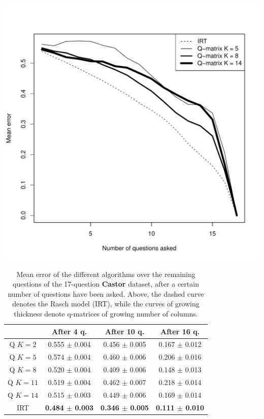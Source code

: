 \documentclass{edm_template}
\begin{document}
\begin{table}[h]
\includegraphics[width=\linewidth]{castor.pdf}
\small\centering\begin{tabular}{@{}c|ccc@{}}
& After 4 q. & After 10 q. & After 16 q.\\
\hline
Q $K = 2$ & 0.555 $\pm$ 0.004 & 0.456 $\pm$ 0.005 & 0.167 $\pm$ 0.012 \\
Q $K = 5$ & 0.574 $\pm$ 0.004 & 0.460 $\pm$ 0.006 & 0.206 $\pm$ 0.016 \\
Q $K = 8$ & 0.520 $\pm$ 0.004 & 0.409 $\pm$ 0.006 & 0.148 $\pm$ 0.013 \\
Q $K = 11$ & 0.519 $\pm$ 0.004 & 0.462 $\pm$ 0.007 & 0.218 $\pm$ 0.014 \\
Q $K = 14$ & 0.515 $\pm$ 0.003 & 0.449 $\pm$ 0.006 & 0.169 $\pm$ 0.014 \\
IRT & \textbf{0.484 $\pm$ \textbf0.003} & \textbf{0.346 $\pm$ 0.005} & \textbf{0.111 $\pm$ 0.010} \\
\end{tabular}
\caption{Mean error of the different algorithms over the remaining questions of the 17-question \textbf{Castor} dataset, after a certain number of questions have been asked. Above, the dashed curve denotes the Rasch model (IRT), while the curves of growing thickness denote q-matrices of growing number of columns.}
\label{tab:castor}
\end{table}
\end{document}

